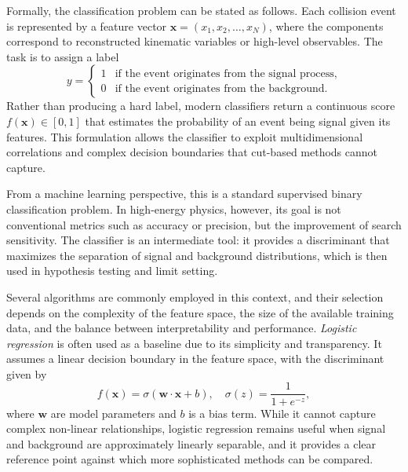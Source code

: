 Formally, the classification problem can be stated as follows. Each collision event is represented by a feature vector $\mathbf{x} = (x_1, x_2, \ldots, x_N)$, where the components correspond to reconstructed kinematic variables or high-level observables. The task is to assign a label
\begin{equation}
y =
\begin{cases}
1 & \text{if the event originates from the signal process}, \\
0 & \text{if the event originates from the background}.
\end{cases}
\end{equation}
Rather than producing a hard label, modern classifiers return a continuous score $f(\mathbf{x}) \in [0,1]$ that estimates the probability of an event being signal given its features. This formulation allows the classifier to exploit multidimensional correlations and complex decision boundaries that cut-based methods cannot capture.

From a machine learning perspective, this is a standard supervised binary classification problem. In high-energy physics, however, its goal is not conventional metrics such as accuracy or precision, but the improvement of search sensitivity. The classifier is an intermediate tool: it provides a discriminant that maximizes the separation of signal and background distributions, which is then used in hypothesis testing and limit setting.

Several algorithms are commonly employed in this context, and their selection depends on the complexity of the feature space, the size of the available training data, and the balance between interpretability and performance. \textit{Logistic regression} is often used as a baseline due to its simplicity and transparency. It assumes a linear decision boundary in the feature space, with the discriminant given by
\begin{equation}
f(\mathbf{x}) = \sigma(\mathbf{w} \cdot \mathbf{x} + b), \quad 
\sigma(z) = \frac{1}{1 + e^{-z}},
\end{equation}
where $\mathbf{w}$ are model parameters and $b$ is a bias term. While it cannot capture complex non-linear relationships, logistic regression remains useful when signal and background are approximately linearly separable, and it provides a clear reference point against which more sophisticated methods can be compared.

